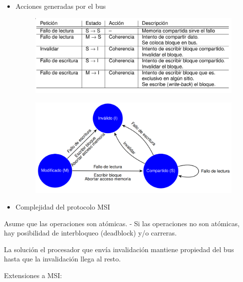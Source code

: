 \documentclass[12pt, twoside, openright]{report} %
\begin{document}
\begin{itemize}
\begin{figure}[H]
      \end{figure}
    \item
      Acciones generadas por el bus
      \begin{figure}[H]
        {\includegraphics[scale=.2]{Untitled 51.png}}
      \end{figure}
      \begin{figure}[H]
        {\includegraphics[scale=.2]{Untitled 52.png}}
      \end{figure}
    \item
      Complejidad del protocolo MSI
    \end{itemize}

    Asume que las operaciones son atómicas. - Si las operaciones no
    son atómicas, hay posibilidad de interbloqueo (deadblock) y/o
    carreras.

    La solución el procesador que envía invalidación mantiene
    propiedad del bus hasta que la invalidación llega al resto.

    Extensiones a MSI:
\end{document}
